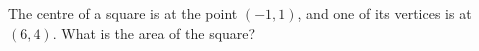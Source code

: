 The centre of a square is at the point $(-1,1)$, and one of its vertices is at $(6,4)$. What is the area of the square?

